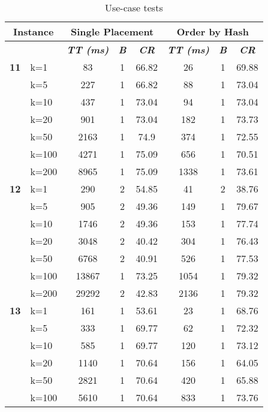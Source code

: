     \begin{table}[htbp]
    \caption{Use-case tests}
    \centering
    \begin{tabular}{|l|l|c|c|c|c|c|c|}
    
    \multicolumn{ 2}{|c|}{\textbf{Instance}} & \multicolumn{ 3}{c|}{\textbf{Single Placement}} & \multicolumn{ 3}{c|}{\textbf{Order by Hash}} \\ \hline
    \multicolumn{ 2}{|l|}{} & \textbf{\textit{TT (ms)}} & \textbf{\textit{B}} & \textbf{\textit{CR}} & \textbf{\textit{TT (ms)}} & \textbf{\textit{B}} & \textbf{\textit{CR}} \\ \hline
    \multicolumn{1}{|r|}{\textbf{11}} & k=1 & 83 & 1 & 66.82 & 26 & 1 & 69.88 \\ 
     & k=5 & 227 & 1 & 66.82 & 88 & 1 & 73.04 \\ 
     & k=10 & 437 & 1 & 73.04 & 94 & 1 & 73.04 \\ 
     & k=20 & 901 & 1 & 73.04 & 182 & 1 & 73.73 \\ 
     & k=50 & 2163 & 1 & 74.9 & 374 & 1 & 72.55 \\ 
     & k=100 & 4271 & 1 & 75.09 & 656 & 1 & 70.51 \\ 
     & k=200 & 8965 & 1 & 75.09 & 1338 & 1 & 73.61 \\ \hline
    \multicolumn{1}{|r|}{\textbf{12}} & k=1 & 290 & 2 & 54.85 & 41 & 2 & 38.76 \\ 
     & k=5 & 905 & 2 & 49.36 & 149 & 1 & 79.67 \\ 
     & k=10 & 1746 & 2 & 49.36 & 153 & 1 & 77.74 \\ 
     & k=20 & 3048 & 2 & 40.42 & 304 & 1 & 76.43 \\ 
     & k=50 & 6768 & 2 & 40.91 & 526 & 1 & 77.53 \\ 
     & k=100 & 13867 & 1 & 73.25 & 1054 & 1 & 79.32 \\ 
     & k=200 & 29292 & 2 & 42.83 & 2136 & 1 & 79.32 \\ \hline
    \multicolumn{1}{|r|}{\textbf{13}} & k=1 & 161 & 1 & 53.61 & 23 & 1 & 68.76 \\ 
     & k=5 & 333 & 1 & 69.77 & 62 & 1 & 72.32 \\ 
     & k=10 & 585 & 1 & 69.77 & 120 & 1 & 73.12 \\ 
     & k=20 & 1140 & 1 & 70.64 & 156 & 1 & 64.05 \\ 
     & k=50 & 2821 & 1 & 70.64 & 420 & 1 & 65.88 \\ 
     & k=100 & 5610 & 1 & 70.64 & 833 & 1 & 73.76 \\ 

\end{tabular}
\end{table}
